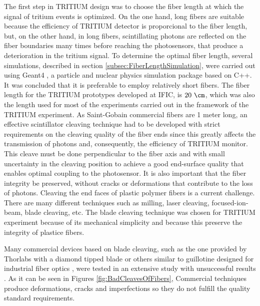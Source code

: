 The first step in TRITIUM design was to choose the fiber length at which the signal of tritium events is optimized. On the one hand, long fibers are suitable because the efficiency of TRITIUM detector is proporcional to the fiber length, but, on the other hand, in long fibers, scintillating photons are reflected on the fiber boundaries many times before reaching the photosensors, that produce a deterioration in the tritium signal. To determine the optimal fiber length, several simulations, described in section \ref{subsec:FiberLengthSimulation}, were carried out using Geant4 \cite{Geant4WebPage}, a particle and nuclear physics simulation package based on C++. It was concluded that it is preferable to employ relatively short fibers. The fiber length for the TRITIUM prototypes developed at IFIC, is $20~\cm$, which was also the length used for most of the experiments carried out in the framework of the TRITIUM experiment. As Saint-Gobain commercial fibers are 1 meter long, an effective scintillator cleaving technique had to be developed with strict requirements on the cleaving quality of the fiber ends since this greatly affects the transmission of photons and, consequently, the efficiency of TRITIUM monitor. This cleave must be done perpendicular to the fiber axis and with small uncertainty in the cleaving position to achieve a good end-surface quality that enables optimal coupling to the photosensor. It is also important that the fiber integrity be preserved, without cracks or deformations that contribute to the loss of photons. Cleaving the end faces of plastic polymer fibers is a current challenge. There are many different techniques such as milling, laser cleaving, focused-ion-beam, blade cleaving, etc. The blade cleaving technique was chosen for TRITIUM experiment because of its mechanical simplicity and because this preserve the integrity of plastice fibers. 

Many commercial devices based on blade cleaving, such as the one provided by Thorlabs with a diamond tipped blade \cite{DiamondThorlabs} or others similar to guillotine designed for industrial fiber optics \cite{GuillotineIFO}, were tested in an extensive study with unsuccessful results \cite{TFGAlberto}. As it can be seen in Figures \ref{fig:BadCleavesOfFibers}, Commercial techniques produce deformations, cracks and imperfections so they do not fulfill the quality standard requirements.

